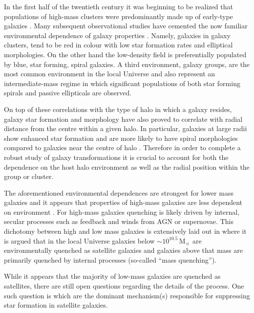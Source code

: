 \documentclass[a4paper,fleqn,usenatbib]{mnras}
\newcommand{\Msun}{\,\mathrm{M_{\sun}}}
\begin{document}
In the first half of the twentieth century it was beginning to be
realized that populations of high-mass clusters were predominantly
made up of early-type galaxies \citep{hubble1931}.  Many subsequent
observational studies have cemented the now
familiar environmental dependence of galaxy properties
\citep[e.g.][]{butcher1978, dressler1980, postman1984, dressler1999,
  blanton2005, wetzel2012}.  Namely, galaxies in galaxy clusters, tend
to be red in colour with low star formation
rates and elliptical morphologies.  On the other hand the
low-density field is preferentially populated by blue, star
forming, spiral galaxies.  A third environment, galaxy groups, are the
most common environment in
the local Universe \citep{geller1983, eke2005} and also represent an
intermediate-mass regime in which significant populations of both
star forming spirals and passive ellipticals are observed.
\par
On top of these correlations with the type of halo in which a galaxy
resides, galaxy star formation and morphology have also proved to
correlate with radial distance from the centre within a given halo.
In particular, galaxies at large radii show enhanced star
formation and are more likely to have spiral morphologies compared to
galaxies near the centre of halo \citep{whitmore1993, goto2003,
  postman2005, rasmussen2012, wetzel2012, fasano2015, haines2015}.  Therefore in
order to complete a robust study of galaxy transformations it is
crucial to account for both the dependence on the host halo environment as
well as the radial position within the group or cluster.
\par
The aforementioned environmental dependences are strongest for lower
mass galaxies and it appears that properties of high-mass galaxies
are less dependent on environment \citep{haines2006, bamford2009}.  For
high-mass galaxies quenching is likely driven by internal, secular
processes such as feedback and winds from AGN or supernovae.  This
dichotomy between high and low mass galaxies is 
extensively laid out in \citet{peng2010} where it is argued that in
the local Universe galaxies below $\sim 10^{10.5}\Msun$ are
environmentally quenched as satellite galaxies and galaxies above that
mass are primarily quenched by internal processes (so-called ``mass
quenching'').
\par
While it appears that the majority of low-mass galaxies are quenched
as satellites, there are still open questions regarding the details of
the process.  One such question is which are the dominant mechanism(s)
responsible for suppressing star formation in satellite galaxies.
\end{document}
